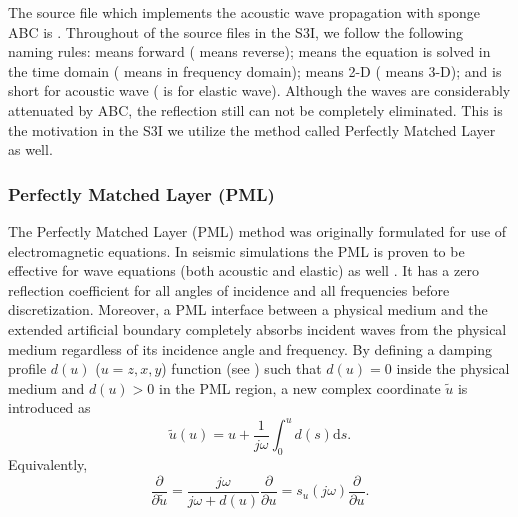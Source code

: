 \documentclass[11pt,titlepage]{article}
\theoremstyle{plain}
\theoremstyle{definition}
\theoremstyle{remark}
\numberwithin{equation}{section}
\begin{document}
The source file which implements the acoustic wave propagation with sponge ABC is . Throughout of the source files in the S3I,  we follow the following naming rules:  means forward ( means reverse);  means the equation is solved in the time domain ( means in frequency domain);  means 2-D ( means 3-D); and  is short for acoustic wave ( is for elastic wave).  Although the waves are considerably attenuated by ABC, the reflection still can not be completely eliminated. This is the motivation in the S3I we utilize the method called Perfectly Matched Layer as well.


\subsubsection{Perfectly Matched Layer (PML)}
The Perfectly Matched Layer (PML) method was originally formulated for use of electromagnetic equations. In seismic simulations the PML is proven to be effective for wave equations (both acoustic and elastic) as well \cite{Komatitsch:2007aa}. It has a zero reflection coefficient for all angles of incidence and all frequencies before discretization. Moreover, a PML interface between a physical medium and the extended artificial boundary completely absorbs incident waves from the physical medium regardless of its incidence angle and frequency. By defining a damping profile $d(u)$ ($u=z, x, y$) function (see ) such that $d(u) = 0$ inside the physical medium and $d(u) > 0$ in the PML region, a new complex coordinate $\tilde{u}$ is introduced as
  \begin{equation}
  \label{eq:replace}
  \tilde{u}(u) = u + \frac{1}{j\omega}\int_0^u d(s)\mathrm{d}s.
  \end{equation}
Equivalently,
  \begin{equation}
  \frac{\partial}{\partial \tilde{u}} = \frac{j\omega}{j\omega + d(u)}\frac{\partial}{\partial u} = s_u(j\omega)\frac{\partial}{\partial u}.
  \end{equation} 
  
\end{document}
